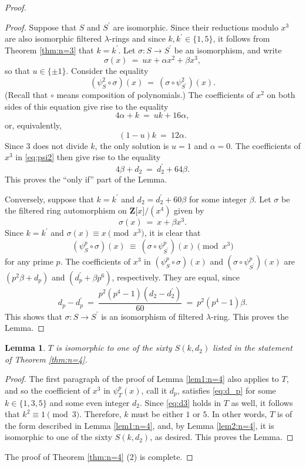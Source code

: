 \documentclass[reqno,11pt]{amsart}
\numberwithin{equation}{subsection}  %
\newtheorem{lemma}[subsection]{Lemma}
\newcommand{\bZ}{\mathbf{Z}}
\begin{document}
\begin{proof}
\begin{proof}
Suppose that $S$ and $S^\prime$ are isomorphic.  Since their reductions modulo $x^3$ are also isomorphic filtered $\lambda$-rings and since $k, k^\prime \in \lbrace 1, 5 \rbrace$, it follows from Theorem \ref{thm:n=3} that $k = k^\prime$.  Let $\sigma \colon S \to S^\prime$ be an isomorphism, and write 
   \[
   \sigma(x) ~=~ ux + \alpha x^2 + \beta x^3,
   \]
so that $u \in \lbrace \pm 1 \rbrace$.  Consider the equality    
   \begin{equation}
   \label{eq:psi2}
   (\psi^2_S \circ \sigma)(x) ~=~ (\sigma \circ \psi^2_{S^\prime})(x).
   \end{equation}
(Recall that $\circ$ means composition of polynomials.)  The coefficients of $x^2$ on both sides of this equation give rise to the equality
   \[
   4 \alpha + k ~=~ uk + 16 \alpha,
   \]
or, equivalently,
   \[
   (1 - u)k ~=~ 12 \alpha.
   \]
Since $3$ does not divide $k$, the only solution is $u = 1$ and $\alpha = 0$.  The coefficients of $x^3$ in \eqref{eq:psi2} then give rise to the equality
   \[
   4 \beta + d_2 ~=~ d_2^\prime + 64 \beta.
   \]
This proves the ``only if'' part of the Lemma.


Conversely, suppose that $k = k^\prime$ and $d_2 = d_2^\prime + 60\beta$ for some integer $\beta$.  Let $\sigma$ be the filtered ring automorphism on $\bZ \lbrack x \rbrack/(x^4)$ given by
   \[
   \sigma(x) ~=~ x + \beta x^3.
   \]
Since $k = k^\prime$ and $\sigma(x) \equiv x \pmod{x^3}$, it is clear that
   \[
   (\psi^p_S \circ \sigma)(x) ~\equiv~ (\sigma \circ \psi^p_{S^\prime})(x) \pmod{x^3}
   \]
for any prime $p$.  The coefficients of $x^3$ in $(\psi^p_S \circ \sigma)(x)$ and $(\sigma \circ \psi^p_{S^\prime})(x)$ are $(p^2\beta + d_p)$ and $(d_p^\prime + \beta p^6)$, respectively.  They are equal, since
   \[
   d_p - d_p^\prime ~=~ \frac{p^2(p^4 - 1)(d_2 - d_2^\prime)}{60} 
   ~=~ p^2(p^4 - 1)\beta.
   \]
This shows that $\sigma \colon S \to S^\prime$ is an isomorphism of filtered $\lambda$-ring.  This proves the Lemma.
\end{proof}



\medskip
\begin{lemma}
\label{lem3:n=4}
$T$ is isomorphic to one of the sixty $S(k, d_2)$ listed in the statement of Theorem \ref{thm:n=4}.
\end{lemma}


\begin{proof}
The first paragraph of the proof of Lemma \ref{lem1:n=4} also applies to $T$, and so the coefficient of $x^3$ in $\psi^p_T(x)$, call it $d_p$, satisfies \eqref{eq:d_p} for some $k \in \lbrace 1, 3, 5 \rbrace$ and some even integer $d_2$.  Since \eqref{eq:d3} holds in $T$ as well, it follows that $k^2 \equiv 1 \pmod{3}$.  Therefore, $k$ must be either $1$ or $5$.  In other words, $T$ is of the form described in Lemma \ref{lem1:n=4}, and, by Lemma \ref{lem2:n=4}, it is isomorphic to one of the sixty $S(k, d_2)$, as desired.  This proves the Lemma.
\end{proof}


The proof of Theorem \ref{thm:n=4} (2) is complete.
\end{proof}
\end{document}
